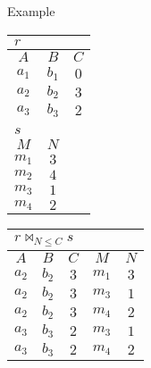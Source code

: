 \begin{multicols}{2}
\begin{CheatsheetEntryFrame}
        \SubsectionFrameAddSeparation
        \begin{RelAlgSubsection}{Example}
        \begin{center}
            {\footnotesize%
                \begin{tabular}{|ccc|}
                    \multicolumn{3}{l}{\normalsize $r$}
                        \\ \hline
                    \multicolumn{1}{|c}{$A$}
                        & \multicolumn{1}{c}{$B$}
                        & \multicolumn{1}{c|}{$C$}
                        \\ \hline\hline
                    $a_1$ & $b_1$ & $0$ \\
                    $a_2$ & $b_2$ & $3$ \\
                    $a_3$ & $b_3$ & $2$ \\ \hline
                    \multicolumn{3}{c}{} \\ %
                    \multicolumn{3}{l}{\normalsize $s$}
                        \\ \cline{1-2}
                    \multicolumn{1}{|c}{$M$}
                        & \multicolumn{1}{c|}{$N$}
                        & \multicolumn{1}{c}{} %
                    \\ \cline{1-2} \cline{1-2}
                        $m_1$ & \multicolumn{1}{c|}{$3$} & \multicolumn{1}{c}{} \\
                        $m_2$ & \multicolumn{1}{c|}{$4$} & \multicolumn{1}{c}{} \\
                        $m_3$ & \multicolumn{1}{c|}{$1$} & \multicolumn{1}{c}{} \\
                        $m_4$ & \multicolumn{1}{c|}{$2$} & \multicolumn{1}{c}{} \\ \cline{1-2}
                \end{tabular}
                \qquad
                \begin{tabular}{|ccccc|}
                    \multicolumn{5}{l}{\normalsize $r \bowtie_{N \le C} s$}
                        \\ \hline
                    \multicolumn{1}{|c}{$A$}
                        & \multicolumn{1}{c}{$B$}
                        & \multicolumn{1}{c}{$C$}
                        & \multicolumn{1}{c}{$M$}
                        & \multicolumn{1}{c|}{$N$}
                        \\ \hline\hline
                    $a_2$ & $b_2$ & $3$ & $m_1$ & $3$ \\
                    $a_2$ & $b_2$ & $3$ & $m_3$ & $1$ \\
                    $a_2$ & $b_2$ & $3$ & $m_4$ & $2$ \\
                    $a_3$ & $b_3$ & $2$ & $m_3$ & $1$ \\
                    $a_3$ & $b_3$ & $2$ & $m_4$ & $2$ \\ \hline
                \end{tabular}
            }
        \end{center}
        \end{RelAlgSubsection}


\end{CheatsheetEntryFrame}
\end{multicols}
